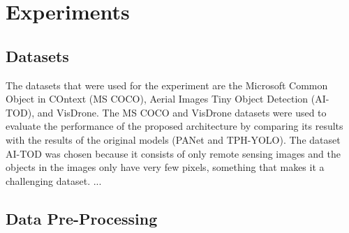 \chapter{Experiments}

\section{Datasets}
The datasets that were used for the experiment are the Microsoft Common Object in COntext (MS COCO), Aerial Images 
Tiny Object Detection (AI-TOD), and VisDrone. The MS COCO and VisDrone datasets were used to evaluate the performance 
of the proposed architecture by comparing its results with the results of the original models (PANet and TPH-YOLO). 
The dataset AI-TOD was chosen because it consists of only remote sensing images and the objects in the images only 
have very few pixels, something that makes it a challenging dataset. ...





\section{Data Pre-Processing}